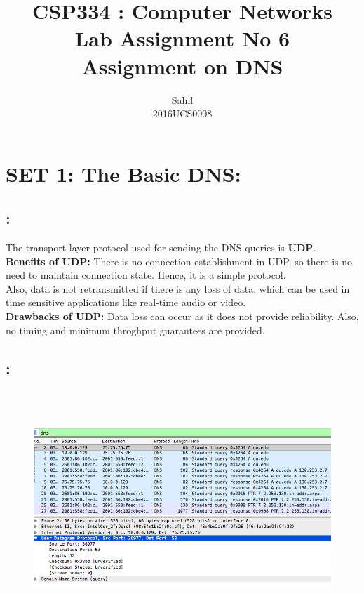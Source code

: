 \documentclass[]{report}
\title{\centering CSP334 : Computer Networks \\Lab Assignment No 6\\Assignment on DNS}
\author{\LARGE Sahil\\2016UCS0008}
\begin{document}
 

\maketitle

\section{SET 1: The Basic DNS:}

\subsection{:}
\large
The transport layer protocol used for sending the DNS queries is \textbf{UDP}.
\\
\textbf{Benefits of UDP:} There is no connection establishment in UDP, so there is no need to maintain connection state. Hence, it is a simple protocol. 
\\
Also, data is not retransmitted if there is any loss of data, which can be used in time sensitive applications like real-time audio or video. 
\\
\textbf{Drawbacks of UDP:} Data loss can occur as it does not provide reliability. Also, no timing and minimum throghput guarantees are provided.

\subsection{:}
\begin{figure}[H]
	\vspace{0pt}
	\includegraphics[height = 250pt, keepaspectratio]{Snapshots/1_2.png}
\end{figure}
\end{document}
